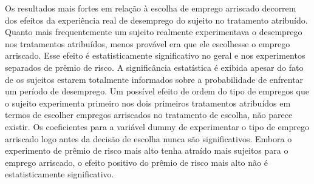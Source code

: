 \documentclass[a4paper,12pt]{article}[abntex2]
\begin{document}
Os resultados mais fortes em relação à escolha de emprego arriscado decorrem dos efeitos da experiência real de desemprego do sujeito no tratamento atribuído. Quanto mais frequentemente um sujeito realmente experimentava o desemprego nos tratamentos atribuídos, menos provável era que ele escolhesse o emprego arriscado. Esse efeito é estatisticamente significativo no geral e nos experimentos separados de prêmio de risco. A significância estatística é exibida apesar do fato de os sujeitos estarem totalmente informados sobre a probabilidade de enfrentar um período de desemprego. Um possível efeito de ordem do tipo de empregos que o sujeito experimenta primeiro nos dois primeiros tratamentos atribuídos em termos de escolher empregos arriscados no tratamento de escolha, não parece existir. Os coeficientes para a variável dummy de experimentar o tipo de emprego arriscado logo antes da decisão de escolha nunca são significativos. Embora o experimento de prêmio de risco mais alto tenha atraído mais sujeitos para o emprego arriscado, o efeito positivo do prêmio de risco mais alto não é estatisticamente significativo.
\end{document}

